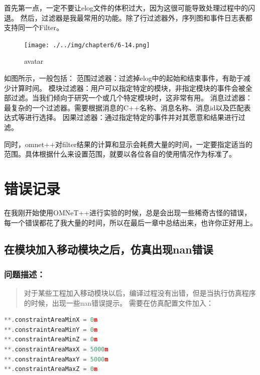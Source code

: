 首先第一点，一定不要让elog文件的体积过大，因为这很可能导致处理过程中的闪退。
然后，过滤器是我最常用的功能。除了行过滤器外，序列图和事件日志表都支持同一个Filter。

\begin{figure}[htbp]
\centering
\texttt{[image: ./../img/chapter6/6-14.png]}
\caption{avatar}
\end{figure}

如图所示，一般包括：
范围过滤器：过滤掉elog中的起始和结束事件，有助于减少计算时间。
模块过滤器：用户可以指定特定的模块，非指定模块的事件会被全部过滤。当我们倾向于研究一个或几个特定模块时，这非常有用。
消息过滤器：最复杂的一个过滤器。需要根据消息的C++名称、消息名称、消息id以及匹配表达式等进行选择。
因果过滤器：通过指定特定的事件并对其愿意和结果进行过滤。

同时，omnet++对filter结果的计算和显示会耗费大量的时间，一定要指定适当的范围。具体根据什么来设置范围，就要以各位各自的使用情况作为标准了。

\chapter{错误记录}
\label{错误记录}

在我刚开始使用OMNeT++进行实验的时候，总是会出现一些稀奇古怪的错误，每一个错误都花了我大量的时间，所以在最后一章中总结出来，也许你正好用上。

\section{在模块加入移动模块之后，仿真出现nan错误}
\label{在模块加入移动模块之后，仿真出现nan错误}

\subsection{问题描述：}
\label{问题描述：}

\begin{quote}
对于某些工程加入移动模块以后，编译过程没有出错，但是当执行仿真程序的时候，出现一些nan错误提示。
需要在仿真配置文件加入：
\end{quote}

\begin{lstlisting}[language=c]
**.constraintAreaMinX = 0m
**.constraintAreaMinY = 0m
**.constraintAreaMinZ = 0m
**.constraintAreaMaxX = 5000m
**.constraintAreaMaxY = 5000m
**.constraintAreaMaxZ = 0m

\end{lstlisting}


